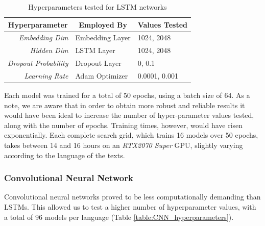 \documentclass[letterpaper,11pt]{article}
\begin{document}
\begin{table}[H]
  \centering
  \begin{tabular}{@{}rll@{}}
  \toprule
  \multicolumn{1}{c}{\textbf{Hyperparameter}} & \multicolumn{1}{c}{\textbf{Employed By}} & \textbf{Values Tested} \\ \midrule
  \textit{Embedding Dim}                               & Embedding Layer                          & 1024, 2048          \\
  \textit{Hidden Dim}                                  & LSTM Layer                               & 1024, 2048          \\
  \textit{Dropout Probability}                         & Dropout Layer                            & 0, 0.1              \\
  \textit{Learning Rate}                               & Adam Optimizer                           & 0.0001, 0.001       \\ \bottomrule
\end{tabular}
\caption{Hyperparameters tested for LSTM networks}
\label{table:LSTM_hyperparameters}
\end{table}

Each model was trained for a total of 50 epochs, using a batch size of 64. As a note, we are aware that in order to obtain more robust and reliable results it would have been ideal to increase the number of hyper-parameter values tested, along with the number of epochs. Training times, however, would have risen exponentially. Each complete search grid, which trains 16 models over 50 epochs, takes between 14 and 16 hours on an \textit{RTX2070 Super} GPU, slightly varying according to the language of the texts.

\subsubsection*{Convolutional Neural Network}

Convolutional neural networks proved to be less computationally demanding than LSTMs. This allowed us to test a higher number of hyperparameter values, with a total of 96 models per language (Table \ref{table:CNN_hyperparameters}).
\end{document}
